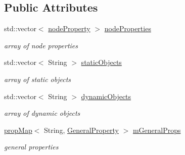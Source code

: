 \subsection*{Public Attributes}
\begin{DoxyCompactItemize}
\item 
std\+::vector$<$ \hyperlink{class_ogre_1_1node_property}{node\+Property} $>$ \hyperlink{class_ogre_1_1_dot_scene_loader_a8aef910eb41e3aa2685d24b60aad4363}{node\+Properties}\hypertarget{class_ogre_1_1_dot_scene_loader_a8aef910eb41e3aa2685d24b60aad4363}{}\label{class_ogre_1_1_dot_scene_loader_a8aef910eb41e3aa2685d24b60aad4363}

\begin{DoxyCompactList}\small\item\em array of node properties \end{DoxyCompactList}\item 
std\+::vector$<$ String $>$ \hyperlink{class_ogre_1_1_dot_scene_loader_a23a316c6eea305326b3be89113bde609}{static\+Objects}\hypertarget{class_ogre_1_1_dot_scene_loader_a23a316c6eea305326b3be89113bde609}{}\label{class_ogre_1_1_dot_scene_loader_a23a316c6eea305326b3be89113bde609}

\begin{DoxyCompactList}\small\item\em array of static objects \end{DoxyCompactList}\item 
std\+::vector$<$ String $>$ \hyperlink{class_ogre_1_1_dot_scene_loader_a95daf060322172a14ee6292e64e2c791}{dynamic\+Objects}\hypertarget{class_ogre_1_1_dot_scene_loader_a95daf060322172a14ee6292e64e2c791}{}\label{class_ogre_1_1_dot_scene_loader_a95daf060322172a14ee6292e64e2c791}

\begin{DoxyCompactList}\small\item\em array of dynamic objects \end{DoxyCompactList}\item 
\hyperlink{classprop_map}{prop\+Map}$<$ String, \hyperlink{class_ogre_1_1_general_property}{General\+Property} $>$ \hyperlink{class_ogre_1_1_dot_scene_loader_a98b2228adaa994df2d99979afc5e7eb1}{m\+General\+Props}\hypertarget{class_ogre_1_1_dot_scene_loader_a98b2228adaa994df2d99979afc5e7eb1}{}\label{class_ogre_1_1_dot_scene_loader_a98b2228adaa994df2d99979afc5e7eb1}

\begin{DoxyCompactList}\small\item\em general properties \end{DoxyCompactList}\end{DoxyCompactItemize}
